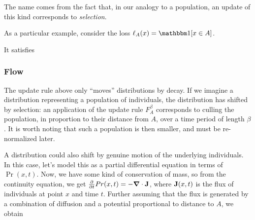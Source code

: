 \documentclass{article}
\begin{document}
The name comes from the fact that, in our analogy to a population, an update of this kind corresponds to \emph{selection}.




%
%


As a particular example, consider the loss $\ell_A(x) = \mathbbm1[x \in A]$.

It satisfies



\subsubsection{Flow}
\def\vgrad{\boldsymbol\nabla}
The update rule above only ``moves'' distributions by decay. If we imagine a distribution representing a population of individuals, the distribution has shifted by selection: an application of the update rule $F_A^\beta$ corresponds to culling the population, in proportion to their distance from $A$, over a time period of length $\beta$.
It is worth noting that such a population is then smaller, and must be re-normalized later.

A distribution could also shift by genuine motion of the underlying individuals.
In this case, let's model this as a partial differential equation in terms of $\Pr(x,t)$.
Now, we have some kind of conservation of mass, so from the continuity equation, we get
$\frac{\partial }{\partial t}Pr(x,t) = - \vgrad \cdot \mat J$,
where $\mathbf{J}(x,t)$ is the flux of individuals at point $x$ and time $t$.
Further assuming that the flux is generated by a combination of diffusion and a potential proportional to distance to $A$, we obtain
\end{document}
